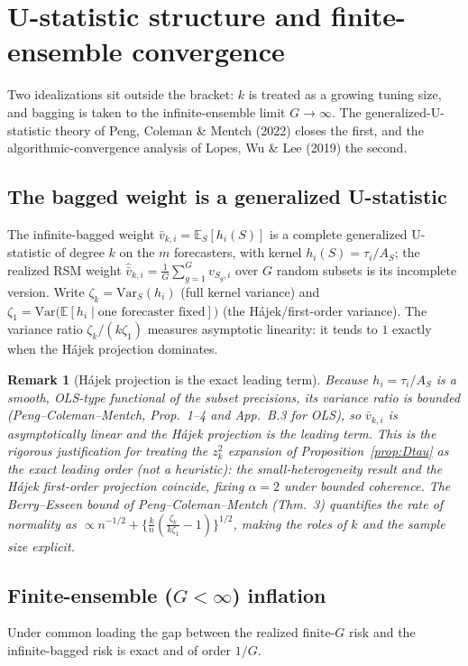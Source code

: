 \documentclass[11pt]{article}
\newcommand{\E}{\mathbb{E}}
\newcommand{\Var}{\mathrm{Var}}
\newtheorem{remark}{Remark}
\begin{document}
\section{U-statistic structure and finite-ensemble convergence}\label{sec:ustat}
Two idealizations sit outside the bracket: $k$ is treated as a growing tuning size, and
bagging is taken to the infinite-ensemble limit $G\to\infty$. The generalized-U-statistic
theory of Peng, Coleman \& Mentch (2022) closes the first, and the algorithmic-convergence
analysis of Lopes, Wu \& Lee (2019) the second.

\subsection*{The bagged weight is a generalized U-statistic}
The infinite-bagged weight $\bar v_{k,i}=\E_S[h_i(S)]$ is a complete generalized
U-statistic of degree $k$ on the $m$ forecasters, with kernel $h_i(S)=\tau_i/A_S$; the
realized RSM weight $\hat{\bar v}_{k,i}=\frac1G\sum_{g=1}^G v_{S_g,i}$ over $G$ random
subsets is its incomplete version. Write $\zeta_k=\Var_S(h_i)$ (full kernel variance) and
$\zeta_1=\Var\big(\E[h_i\mid\text{one forecaster fixed}]\big)$ (the H\'ajek/first-order
variance). The variance ratio $\zeta_k/(k\zeta_1)$ measures asymptotic linearity: it tends
to $1$ exactly when the H\'ajek projection dominates.

\begin{remark}[H\'ajek projection is the exact leading term]\label{rem:hajek}
Because $h_i=\tau_i/A_S$ is a smooth, OLS-type functional of the subset precisions, its
variance ratio is bounded (Peng--Coleman--Mentch, Prop.~1--4 and App.~B.3 for OLS), so
$\bar v_{k,i}$ is asymptotically linear and the H\'ajek projection \emph{is} the leading
term. This is the rigorous justification for treating the $z_k^2$ expansion of
Proposition~\ref{prop:Dtau} as the exact leading order (not a heuristic): the
small-heterogeneity result and the H\'ajek first-order projection coincide, fixing
$\alpha=2$ under bounded coherence. The Berry--Esseen bound of Peng--Coleman--Mentch
(Thm.~3) quantifies the rate of normality as $\propto n^{-1/2}+\{\tfrac kn(\tfrac{\zeta_k}
{k\zeta_1}-1)\}^{1/2}$, making the roles of $k$ and the sample size explicit.
\end{remark}

\subsection*{Finite-ensemble ($G<\infty$) inflation}
Under common loading the gap between the realized finite-$G$ risk and the infinite-bagged
risk is exact and of order $1/G$.
\end{document}
